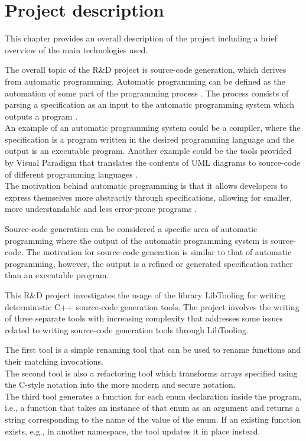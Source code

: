 \chapter{Project description}
This chapter provides an overall description of the project including a brief overview of the main technologies used.

The overall topic of the R\&D project is source-code generation, which derives from automatic programming. Automatic programming can be defined as the automation of some part of the programming process \cite{barrAutomaticProgramming1982}. The process consists of parsing a specification as an input to the automatic programming system which outputs a program \cite{novakjr.CS394PAutomatic}.\\
An example of an automatic programming system could be a compiler, where the specification is a program written in the desired programming language and the output is an executable program. Another example could be the tools provided by Visual Paradigm that translates the contents of UML diagrams to source-code of different programming languages \cite{visualparadigmUMLCodeGeneration}.\\
The motivation behind automatic programming is that it allows developers to express themselves more abstractly through specifications, allowing for smaller, more understandable and less error-prone programs \cite{novakjr.CS394PAutomatic}.

Source-code generation can be considered a specific area of automatic programming where the output of the automatic programming system is source-code. 
The motivation for source-code generation is similar to that of automatic programming, however, the output is a refined or generated specification rather than an executable program.

This R\&D project investigates the usage of the library LibTooling for writing deterministic C++ source-code generation tools. The project involves the writing of three separate tools with increasing complexity that addresses some issues related to writing source-code generation tools through LibTooling.

The first tool is a simple renaming tool that can be used to rename functions and their matching invocations.\\
The second tool is also a refactoring tool which transforms arrays specified using the C-style notation into the more modern and secure  notation. \\
The third tool generates a  function for each enum declaration inside the program, i.e., a function that takes an instance of that enum as an argument and returns a string corresponding to the name of the value of the enum. If an existing  function exists, e.g., in another namespace, the tool updates it in place instead.

